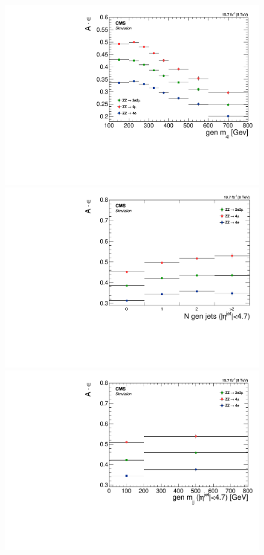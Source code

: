 \begin{figure}[hbtp]
  \begin{center}
    \includegraphics[width=\cmsFigWidth]{Figures/DiffAcceptance_Mass_Pow}
    \includegraphics[width=\cmsFigWidth]{Figures/DiffAcceptance_Jets_Mad}
    \includegraphics[width=\cmsFigWidth]{Figures/DiffAcceptance_Mjj_Mad}

\end{center}
\end{figure}
